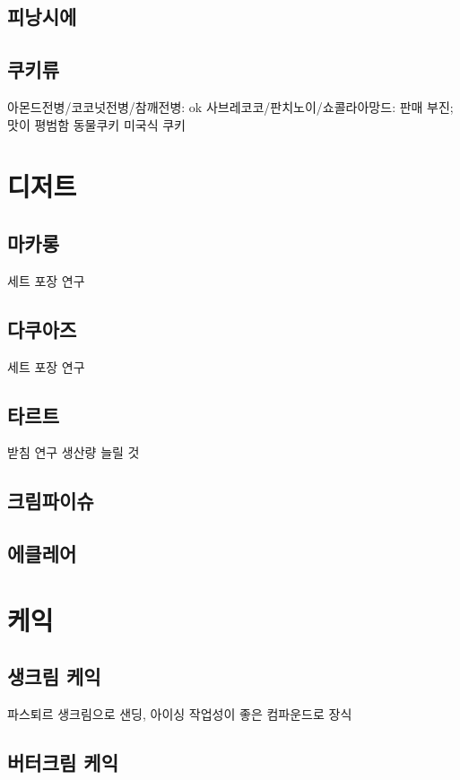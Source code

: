 \documentclass{myproc}
\begin{document}
\subsection{\textcolor{blue2}{피낭시에}}

\subsection{\textcolor{blue2}{쿠키류}}
\bit
\w 아몬드전병/코코넛전병/참깨전병: ok
\w 사브레코코/판치노이/쇼콜라아망드: 판매 부진; 맛이 평범함
\w 동물쿠키
\w 미국식 쿠키
\eit


\section{\textcolor{red2}{디저트}}
\subsection{\textcolor{blue2}{마카롱}}
\bit
\w 세트 포장 연구
\eit
\subsection{\textcolor{blue2}{다쿠아즈}}
\bit
\w 세트 포장 연구
\eit
\subsection{\textcolor{blue2}{타르트}}
\bit
\w 받침 연구
\w 생산량 늘릴 것
\eit

\subsection{\textcolor{blue2}{크림파이슈}}
\subsection{\textcolor{green2}{에클레어}}

\section{\textcolor{red2}{케익}}
\subsection{\textcolor{blue2}{생크림 케익}}
\bit
\w 파스퇴르 생크림으로 샌딩, 아이싱
\w 작업성이 좋은 컴파운드로 장식
\eit

\subsection{\textcolor{blue2}{버터크림 케익}}
\end{document}
